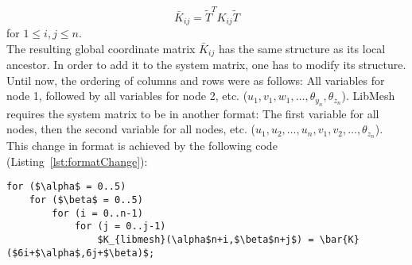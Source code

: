    \begin{equation*}
   \bar{K}_{ij} = \tilde{T}^T K_{ij} \tilde{T}
   \end{equation*}
   for $1 \leq i,j \leq n$.\\
   The resulting global coordinate matrix $\bar{K}_{ij}$ has the same structure as its local ancestor. In order to add it to the system matrix, one has to modify its structure. Until now, the ordering of columns and rows were as follows: All variables for node 1, followed by all variables for node 2, etc. ($u_1, v_1, w_1, \ldots, \theta_{y_n}, \theta_{z_n}$). LibMesh requires the system matrix to be in another format: The first variable for all nodes, then the second variable for all nodes, etc. ($u_1, u_2, \ldots, u_n, v_1, v_2, \ldots, \theta_{z_n}$). This change in format is achieved by the following code (Listing~\ref{lst:formatChange}):
\begin{lstlisting}[caption=Bring stiffness matrix into libMesh conform format,label=lst:formatChange,mathescape,numbers=none]
for ($\alpha$ = 0..5)
	for ($\beta$ = 0..5)
		for (i = 0..n-1)
			for (j = 0..j-1)
				$K_{libmesh}(\alpha$n+i,$\beta$n+j$) = \bar{K}($6i+$\alpha$,6j+$\beta)$;
\end{lstlisting}

